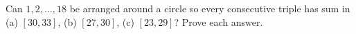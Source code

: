 Can $1,2,\ldots,18$ be arranged around a circle so every consecutive triple has sum in (a) $[30,33]$, (b) $[27,30]$, (c) $[23,29]$? Prove each answer.
